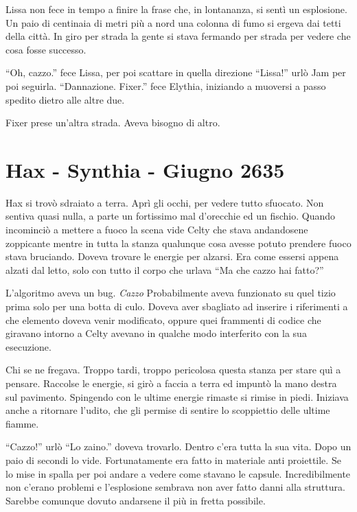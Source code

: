     Lissa non fece in tempo a finire la frase che, in lontananza, si sentì
    un esplosione. Un paio di centinaia di metri più a nord una colonna di fumo si
    ergeva dai tetti della città. In giro per strada la gente si stava
    fermando per strada per vedere che cosa fosse successo.

    ``Oh, cazzo.'' fece Lissa, per poi scattare in quella direzione
    ``Lissa!'' urlò Jam per poi seguirla. ``Dannazione. Fixer.'' fece
    Elythia, iniziando a muoversi a passo spedito dietro alle altre due.

    Fixer prese un'altra strada. Aveva bisogno di altro.

    \section{Hax - Synthia - Giugno 2635}
    Hax si trovò sdraiato a terra. Aprì gli occhi, per vedere tutto
    sfuocato. Non sentiva quasi nulla, a parte un fortissimo mal
    d'orecchie ed un fischio. Quando incominciò a mettere a fuoco la scena
    vide Celty che stava andandosene zoppicante mentre in tutta la stanza
    qualunque cosa avesse potuto prendere fuoco stava bruciando. Doveva trovare le energie
    per alzarsi. Era come essersi appena alzati dal letto, solo con tutto
    il corpo che urlava ``Ma che cazzo hai fatto?''

    L'algoritmo aveva un bug. \emph{Cazzo} Probabilmente aveva funzionato
    su quel tizio prima solo per una botta di culo. Doveva aver sbagliato
    ad inserire i riferimenti a che elemento doveva venir modificato,
    oppure quei frammenti di codice che giravano intorno a Celty avevano in
    qualche modo interferito con la sua esecuzione.

    Chi se ne fregava. Troppo tardi, troppo pericolosa questa stanza per
    stare quì a pensare. Raccolse le energie, si girò a faccia a terra ed
    impuntò la mano destra sul pavimento. Spingendo con le ultime energie
    rimaste si rimise in piedi. Iniziava anche a ritornare l'udito, che gli
    permise di sentire lo scoppiettio delle ultime fiamme.

    ``Cazzo!'' urlò ``Lo zaino.'' doveva trovarlo. Dentro c'era tutta la
    sua vita. Dopo un paio di secondi lo vide. Fortunatamente era fatto in
    materiale anti proiettile. Se lo mise in spalla per poi andare a vedere
    come stavano le capsule. Incredibilmente non c'erano problemi e
    l'esplosione sembrava non aver fatto danni alla struttura. Sarebbe
    comunque dovuto andarsene il più in fretta possibile.

